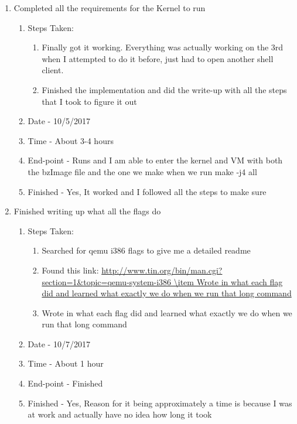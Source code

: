 \documentclass[journal,10pt,onecolumn,compsoc]{IEEEtran} \usepackage[margin=1.0in]{geometry} \usepackage{pdfpages}
\begin{document}
\begin{enumerate}
	\item Completed all the requirements for the Kernel to run
		\begin{enumerate}[label=(\Alph*)]
			\item Steps Taken:
				\begin{enumerate}[label=(\alph*)]
					\item Finally got it working. Everything was actually working on the 3rd when I attempted to do it before, just had to open another shell client.
					\item Finished the implementation and did the write-up with all the steps that I took to figure it out
				\end{enumerate}
			\item Date - 10/5/2017
			\item Time - About 3-4 hours
			\item End-point - Runs and I am able to enter the kernel and VM with both the bzImage file and the one we make when we run make -j4 all
			\item Finished - Yes, It worked and I followed all the steps to make sure
		\end {enumerate}		
			
	\item Finished writing up what all the flags do
		\begin{enumerate}[label=(\Alph*)]
			\item Steps Taken:
				\begin{enumerate}[label=(\alph*)]
					\item Searched for qemu i386 flags to give me a detailed readme
					\item Found this link: \url {http://www.tin.org/bin/man.cgi?section=1&topic=qemu-system-i386
					\item Wrote in what each flag did and learned what exactly we do when we run that long command}
					\item Wrote in what each flag did and learned what exactly we do when we run that long command
				\end{enumerate}
			\item Date - 10/7/2017
			\item Time - About 1 hour
			\item End-point - Finished
			\item Finished -  Yes, Reason for it being approximately a time is because I was at work and actually have no idea how long it took
		\end {enumerate}		
			

\end{enumerate}
\end{document}
